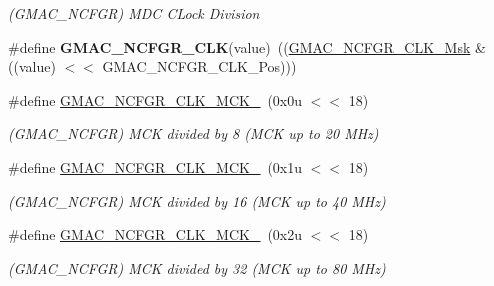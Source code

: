\begin{DoxyCompactItemize}
\begin{DoxyCompactList}\small\item\em (G\+M\+A\+C\+\_\+\+N\+C\+F\+GR) M\+DC C\+Lock Division \end{DoxyCompactList}\item 
\mbox{\label{group__SAMV71__GMAC_gae4247183dae9e114aa17becb809b847b}} 
\#define {\bfseries G\+M\+A\+C\+\_\+\+N\+C\+F\+G\+R\+\_\+\+C\+LK}(value)~((\mbox{\hyperlink{group__SAMV71__GMAC_ga54364bf4348097e2317950630b2fc53e}{G\+M\+A\+C\+\_\+\+N\+C\+F\+G\+R\+\_\+\+C\+L\+K\+\_\+\+Msk}} \& ((value) $<$$<$ G\+M\+A\+C\+\_\+\+N\+C\+F\+G\+R\+\_\+\+C\+L\+K\+\_\+\+Pos)))
\item 
\mbox{\label{group__SAMV71__GMAC_ga8d13ce400afcd9fb73778d0e2752cc29}} 
\#define \mbox{\hyperlink{group__SAMV71__GMAC_ga8d13ce400afcd9fb73778d0e2752cc29}{G\+M\+A\+C\+\_\+\+N\+C\+F\+G\+R\+\_\+\+C\+L\+K\+\_\+\+M\+C\+K\+\_}}~(0x0u $<$$<$ 18)
\begin{DoxyCompactList}\small\item\em (G\+M\+A\+C\+\_\+\+N\+C\+F\+GR) M\+CK divided by 8 (M\+CK up to 20 M\+Hz) \end{DoxyCompactList}\item 
\mbox{\label{group__SAMV71__GMAC_gad6cc83200f34d4f307b7e9cd980abb77}} 
\#define \mbox{\hyperlink{group__SAMV71__GMAC_gad6cc83200f34d4f307b7e9cd980abb77}{G\+M\+A\+C\+\_\+\+N\+C\+F\+G\+R\+\_\+\+C\+L\+K\+\_\+\+M\+C\+K\+\_}}~(0x1u $<$$<$ 18)
\begin{DoxyCompactList}\small\item\em (G\+M\+A\+C\+\_\+\+N\+C\+F\+GR) M\+CK divided by 16 (M\+CK up to 40 M\+Hz) \end{DoxyCompactList}\item 
\mbox{\label{group__SAMV71__GMAC_ga24ba57f86aff162eda626c523b56a2d5}} 
\#define \mbox{\hyperlink{group__SAMV71__GMAC_ga24ba57f86aff162eda626c523b56a2d5}{G\+M\+A\+C\+\_\+\+N\+C\+F\+G\+R\+\_\+\+C\+L\+K\+\_\+\+M\+C\+K\+\_}}~(0x2u $<$$<$ 18)
\begin{DoxyCompactList}\small\item\em (G\+M\+A\+C\+\_\+\+N\+C\+F\+GR) M\+CK divided by 32 (M\+CK up to 80 M\+Hz) \end{DoxyCompactList}\item 
\mbox{\label{group__SAMV71__GMAC_gae867aa8a58afa86a0424e23e58c174c1}} 

\end{DoxyCompactItemize}
